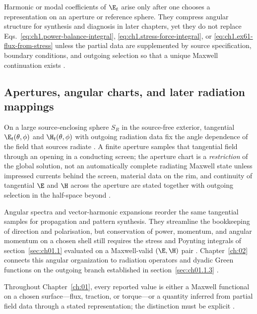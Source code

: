 Harmonic or modal coefficients of $\E_t$ arise only after one chooses a representation on an aperture or reference sphere. They compress angular structure for synthesis and diagnosis in later chapters, yet they do not replace Eqs.~\eqref{eq:ch1.power-balance-integral}, \eqref{eq:ch1.stress-force-integral}, or \eqref{eq:ch1.ex61-flux-from-stress} unless the partial data are supplemented by source specification, boundary conditions, and outgoing selection so that a unique Maxwell continuation exists \cite{hansen1988,stratton1941}.

\subsection{Apertures, angular charts, and later radiation mappings}
\label{sec:ch01.5.4}

On a large source-enclosing sphere $S_R$ in the source-free exterior, tangential $\E_t(\theta,\phi)$ and $\H_t(\theta,\phi)$ with outgoing radiation data fix the angle dependence of the field that sources radiate \cite{stratton1941}. A finite aperture samples that tangential field through an opening in a conducting screen; the aperture chart is a \emph{restriction} of the global solution, not an automatically complete radiating Maxwell state unless impressed currents behind the screen, material data on the rim, and continuity of tangential $\E$ and $\H$ across the aperture are stated together with outgoing selection in the half-space beyond \cite{hansen1988,harrington2001}.

Angular spectra and vector-harmonic expansions reorder the same tangential samples for propagation and pattern synthesis. They streamline the bookkeeping of direction and polarisation, but conservation of power, momentum, and angular momentum on a chosen shell still requires the stress and Poynting integrals of section~\ref{sec:ch01.1} evaluated on a Maxwell-valid $(\E,\H)$ pair \cite{stratton1941}. Chapter~\ref{ch:02} connects this angular organization to radiation operators and dyadic Green functions on the outgoing branch established in section~\ref{sec:ch01.1.3} \cite{harrington2001,tai1994}.

\label{prop:ch1.observable-inference-criterion}
Throughout Chapter~\ref{ch:01}, every reported value is either a Maxwell functional on a chosen surface---flux, traction, or torque---or a quantity inferred from partial field data through a stated representation; the distinction must be explicit \cite{stratton1941}.

